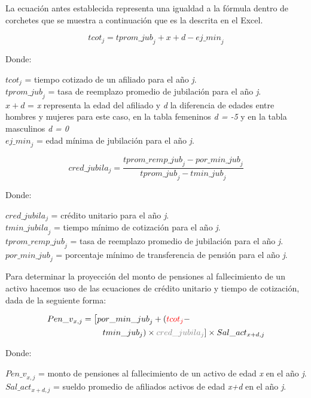 \documentclass[
  letterpaper,
  DIV=11,
  numbers=noendperiod]{scrreprt}
\begin{document}
La ecuación antes establecida representa una igualdad a la fórmula
dentro de corchetes que se muestra a continuación que es la descrita en
el Excel.

\begin{equation}
tcot_j = {tprom\_{jub}}_j + x + d - {ej\_{min}}_j
  \label{eq:tcot}
\end{equation}

Donde:

\(tcot_j\) = tiempo cotizado de un afiliado para el año \emph{j}.\\
\({tprom\_{jub}}_j\) = tasa de reemplazo promedio de jubilación para el
año \emph{j}.\\
\(x+d\) = \emph{x} representa la edad del afiliado y \emph{d} la
diferencia de edades entre hombres y mujeres para este caso, en la tabla
femeninos \emph{d = -5} y en la tabla masculinos \emph{d = 0}\\
\({ej\_{min}}_j\) = edad mínima de jubilación para el año \emph{j}.

\begin{equation}
cred\_jubila_j = \frac{{tprom\_{remp\_{jub}}}_j-{por\_{min\_{jub}}}_j}{{tprom\_{jub}}_j-t{min\_{jub}}_j}
  \label{eq:credjub}
\end{equation}

Donde:

\(cred\_jubila_j\) = crédito unitario para el año \emph{j}.\\
\(t{min\_{jubila}}_j\) = tiempo mínimo de cotización para el año
\emph{j}.\\
\({tprom\_{remp\_{jub}}}_j\) = tasa de reemplazo promedio de jubilación
para el año \emph{j}.\\
\({por\_{min\_{jub}}}_j\) = porcentaje mínimo de transferencia de
pensión para el año \emph{j}.

Para determinar la proyección del monto de pensiones al fallecimiento de
un activo hacemos uso de las ecuaciones de crédito unitario y tiempo de
cotización, dada de la seguiente forma:

\begin{align} {Pen\_v}_{x,j} &= \left[ {por\_{min\_{jub}}}_j + \left( {\color{red}{tcot_j}} - \right. \right.\nonumber  \\ &\qquad \left. \left. tmin\_jub_j \right) \times {\color{gray}{cred\_jubila_j}}\right] \times Sal\_{act_{x+d,j}} \end{align}

Donde:

\({Pen\_v}_{x,j}\) = monto de pensiones al fallecimiento de un activo de
edad \emph{x} en el año \emph{j}.\\
\({Sal\_act}_{x+d,j}\) = sueldo promedio de afiliados activos de edad
\emph{x+d} en el año \emph{j}.
\end{document}

